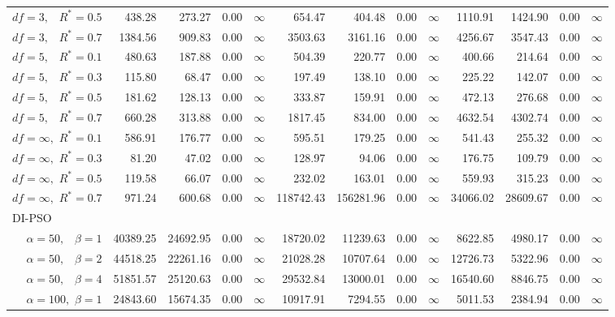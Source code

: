 \documentclass[12pt]{article}
\begin{document}
\begin{table}[ht]
{\begin{tabular}{r|rrrr|rrrr|rrrr}
  $df = 3,\enspace$ $R^* =0.5$ & 438.28 & 273.27 & 0.00 & $\infty$ & 654.47 & 404.48 & 0.00 & $\infty$ & 1110.91 & 1424.90 & 0.00 & $\infty$ \\ 
  $df = 3,\enspace$ $R^* =0.7$ & 1384.56 & 909.83 & 0.00 & $\infty$ & 3503.63 & 3161.16 & 0.00 & $\infty$ & 4256.67 & 3547.43 & 0.00 & $\infty$ \\ 
  $df = 5,\enspace$ $R^* =0.1$ & 480.63 & 187.88 & 0.00 & $\infty$ & 504.39 & 220.77 & 0.00 & $\infty$ & 400.66 & 214.64 & 0.00 & $\infty$ \\ 
  $df = 5,\enspace$ $R^* =0.3$ & 115.80 & 68.47 & 0.00 & $\infty$ & 197.49 & 138.10 & 0.00 & $\infty$ & 225.22 & 142.07 & 0.00 & $\infty$ \\ 
  $df = 5,\enspace$ $R^* =0.5$ & 181.62 & 128.13 & 0.00 & $\infty$ & 333.87 & 159.91 & 0.00 & $\infty$ & 472.13 & 276.68 & 0.00 & $\infty$ \\ 
  $df = 5,\enspace$ $R^* =0.7$ & 660.28 & 313.88 & 0.00 & $\infty$ & 1817.45 & 834.00 & 0.00 & $\infty$ & 4632.54 & 4302.74 & 0.00 & $\infty$ \\ 
  $df = \infty,$ $R^* =0.1$ & 586.91 & 176.77 & 0.00 & $\infty$ & 595.51 & 179.25 & 0.00 & $\infty$ & 541.43 & 255.32 & 0.00 & $\infty$ \\ 
  $df = \infty,$ $R^* =0.3$ & 81.20 & 47.02 & 0.00 & $\infty$ & 128.97 & 94.06 & 0.00 & $\infty$ & 176.75 & 109.79 & 0.00 & $\infty$ \\ 
  $df = \infty,$ $R^* =0.5$ & 119.58 & 66.07 & 0.00 & $\infty$ & 232.02 & 163.01 & 0.00 & $\infty$ & 559.93 & 315.23 & 0.00 & $\infty$ \\ 
  $df = \infty,$ $R^* =0.7$ & 971.24 & 600.68 & 0.00 & $\infty$ & 118742.43 & 156281.96 & 0.00 & $\infty$ & 34066.02 & 28609.67 & 0.00 & $\infty$ \\ 
\hline
\multicolumn{1}{l|}{DI-PSO} &&&&&&&&&&&&\\
  $\alpha = 50,\enspace$ $\beta =1$ & 40389.25 & 24692.95 & 0.00 & $\infty$ & 18720.02 & 11239.63 & 0.00 & $\infty$ & 8622.85 & 4980.17 & 0.00 & $\infty$ \\ 
  $\alpha = 50,\enspace$ $\beta =2$ & 44518.25 & 22261.16 & 0.00 & $\infty$ & 21028.28 & 10707.64 & 0.00 & $\infty$ & 12726.73 & 5322.96 & 0.00 & $\infty$ \\ 
  $\alpha = 50,\enspace$ $\beta =4$ & 51851.57 & 25120.63 & 0.00 & $\infty$ & 29532.84 & 13000.01 & 0.00 & $\infty$ & 16540.60 & 8846.75 & 0.00 & $\infty$ \\ 
  $\alpha = 100,$ $\beta =1$ & 24843.60 & 15674.35 & 0.00 & $\infty$ & 10917.91 & 7294.55 & 0.00 & $\infty$ & 5011.53 & 2384.94 & 0.00 & $\infty$ \\ 

\end{tabular}}
\end{table}
\end{document}
